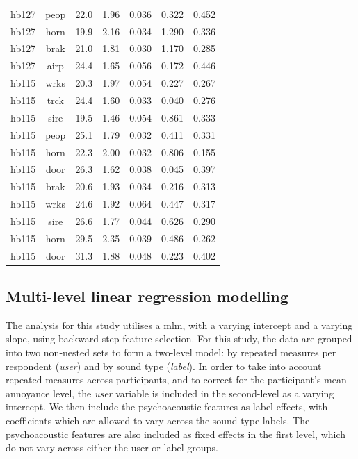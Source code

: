 \begin{table}
{\begin{tabular}{ccccccc}
hb127 & peop & 22.0 & 1.96 & 0.036 & 0.322 & 0.452 \\
hb127 & horn & 19.9 & 2.16 & 0.034 & 1.290 & 0.336 \\
hb127 & brak & 21.0 & 1.81 & 0.030 & 1.170 & 0.285 \\
hb127 & airp & 24.4 & 1.65 & 0.056 & 0.172 & 0.446 \\ 
\hline
hb115 & wrks & 20.3 & 1.97 & 0.054 & 0.227 & 0.267 \\
hb115 & trck & 24.4 & 1.60 & 0.033 & 0.040 & 0.276 \\
hb115 & sire & 19.5 & 1.46 & 0.054 & 0.861 & 0.333 \\
hb115 & peop & 25.1 & 1.79 & 0.032 & 0.411 & 0.331 \\
hb115 & horn & 22.3 & 2.00 & 0.032 & 0.806 & 0.155 \\
hb115 & door & 26.3 & 1.62 & 0.038 & 0.045 & 0.397 \\
hb115 & brak & 20.6 & 1.93 & 0.034 & 0.216 & 0.313 \\ 
\hline
hb115 & wrks & 24.6 & 1.92 & 0.064 & 0.447 & 0.317 \\
hb115 & sire & 26.6 & 1.77 & 0.044 & 0.626 & 0.290 \\
hb115 & horn & 29.5 & 2.35 & 0.039 & 0.486 & 0.262 \\
hb115 & door & 31.3 & 1.88 & 0.048 & 0.223 & 0.402 \\
\bottomrule
\end{tabular}
}
\end{table}

\subsection{Multi-level linear regression modelling}

The analysis for this study utilises a \gls{mlm}, with a varying intercept and a varying slope, using backward step feature selection. For this study, the data are grouped into two non-nested sets to form a two-level model: by repeated measures per respondent (\emph{user}) and by sound type (\emph{label}). In order to take into account repeated measures across participants, and to correct for the participant's mean annoyance level, the \emph{user} variable is included in the second-level as a varying intercept. We then include the psychoacoustic features as label effects, with coefficients which are allowed to vary across the sound type labels. The psychoacoustic features are also included as fixed effects in the first level, which do not vary across either the user or label groups.

